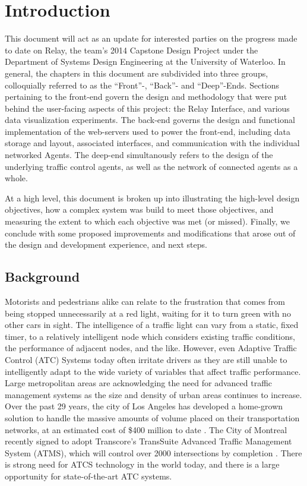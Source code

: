 \documentclass{report}
\begin{document}
\chapter{Introduction}
\setlength{\parindent}{1cm}
This document will act as an update for interested parties on the progress made to date on Relay, the team's 2014 Capstone Design Project under the Department of Systems Design Engineering at the University of Waterloo. 
In general, the chapters in this document are subdivided into three groups, colloquially referred to as the ``Front''-, ``Back''- and ``Deep''-Ends.
Sections pertaining to the front-end govern the design and methodology that were put behind the user-facing aspects of this project: the Relay Interface, and various data visualization experiments.
The back-end governs the design and functional implementation of the web-servers used to power the front-end, including data storage and layout, associated interfaces, and communication with the individual networked Agents.
The deep-end simultanously refers to the design of the underlying traffic control agents, as well as the network of connected agents as a whole.

At a high level, this document is broken up into illustrating the high-level design objectives, how a complex system was build to meet those objectives, and measuring the extent to which each objective was met (or missed).
Finally, we conclude with some proposed improvements and modifications that arose out of the design and development experience, and next steps.


\section{Background}
Motorists and pedestrians alike can relate to the frustration that comes from being stopped unnecessarily at a red light, waiting for it to turn green with no other cars in sight.
The intelligence of a traffic light can vary from a static, fixed timer, to a relatively intelligent node which considers existing traffic conditions, the performance of adjacent nodes, and the like.
However, even Adaptive Traffic Control (ATC) Systems today often irritate drivers as they are still unable to intelligently adapt to the wide variety of variables that affect traffic performance.\\

Large metropolitan areas are acknowledging the need for advanced traffic management systems as the size and density of urban areas continues to increase.
Over the past 29 years, the city of Los Angeles has developed a home-grown solution to handle the massive amounts of volume placed on their transportation networks, at an estimated cost of \$400 million to date \cite{la-atcs-article}.
The City of Montreal recently signed to adopt Transcore's TransSuite Advanced Traffic Management System (ATMS), which will control over 2000 intersections by completion \cite{montreal-transcore}.
There is strong need for ATCS technology in the world today, and there is a large opportunity for state-of-the-art ATC systems.
\end{document}
